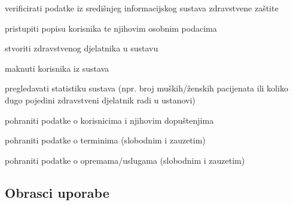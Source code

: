 \begin{packed_enum}
\begin{packed_enum}
				
			\end{packed_enum}
			
			
			\item  {}
			
			\begin{packed_enum}
				
				\item verificirati podatke iz središnjeg informacijskog sustava zdravstvene zaštite
				\item pristupiti popisu korisnika te njihovim osobnim podacima
				\item stvoriti zdravstvenog djelatnika u sustavu
				\item maknuti korisnika iz sustava
				\item pregledavati statistiku sustava (npr. broj muških/ženskih pacijenata ili koliko dugo pojedini zdravstveni djelatnik radi u ustanovi)
				
			\end{packed_enum}
			
			\item  {}
			
			\begin{packed_enum}
				
				\item pohraniti podatke o korisnicima i njihovim dopuštenjima
				\item pohraniti podatke o terminima (slobodnim i zauzetim)
				\item pohraniti podatke o opremama/uslugama (slobodnim i zauzetim)
				
			\end{packed_enum}
		\end{packed_enum}
			
			\eject 
			
			
				
			\subsection{Obrasci uporabe}
	

